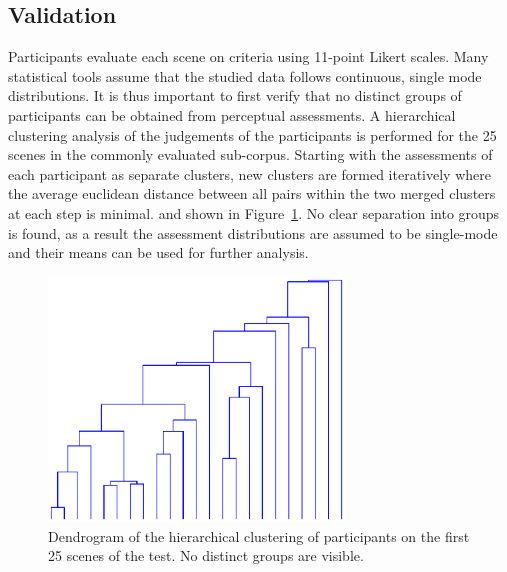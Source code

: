 \documentclass[11pt,a4paper]{article}
\begin{document}
\subsection{Validation}
\label{sec:data_val}

Participants evaluate each scene on criteria using 11-point Likert scales. Many statistical tools assume that the studied data follows continuous, single mode distributions. It is thus important to first verify that no distinct groups of participants can be obtained from perceptual assessments. A hierarchical clustering analysis of the judgements of the participants is performed for the 25 scenes in the commonly evaluated sub-corpus. Starting with the assessments of each participant as separate clusters, new clusters are formed iteratively where the average euclidean distance between all pairs within the two merged clusters at each step is minimal. and shown in Figure~\ref{fig:hclusters}. No clear separation into groups is found, as a result the assessment distributions are assumed to be single-mode and their means can be used for further analysis.\\

\begin{figure}[!h]
    \centering
    \includegraphics[width=0.7\textwidth]{figures/subj_gr.eps}
    \caption{Dendrogram of the hierarchical clustering of participants on the first 25 scenes of the test. No distinct groups are visible.}\label{fig:hclusters}
\end{figure}
\end{document}
